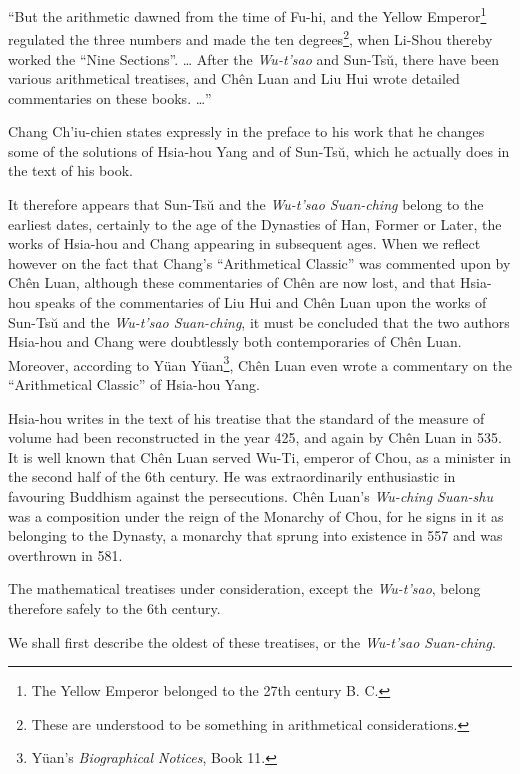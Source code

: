 \documentclass[11pt]{article}
\newcommand{\scanpage}[2]{\clearpage\setcounter{footnote}{0}\noindent{\footnotesize\color{gray}PDF page #1 · #2}\par\medskip}
\newcommand{\scanfooter}{}
\begin{document}
``But the arithmetic dawned from the time of Fu-hi, and the Yellow Emperor\footnote{The Yellow Emperor belonged to the 27th century B. C.} regulated the three numbers and made the ten degrees\footnote{These are understood to be something in arithmetical considerations.}, when Li-Shou thereby worked the ``Nine Sections''. \ldots{} After the \emph{Wu-t'sao} and Sun-Tsŭ, there have been various arithmetical treatises, and Chên Luan and Liu Hui wrote detailed commentaries on these books. \ldots{}''

Chang Ch'iu-chien states expressly in the preface to his work that he changes some of the solutions of Hsia-hou Yang and of Sun-Tsŭ, which he actually does in the text of his book.

It therefore appears that Sun-Tsŭ and the \emph{Wu-t'sao Suan-ching} belong to the earliest dates, certainly to the age of the Dynasties of Han, Former or Later, the works of Hsia-hou and Chang appearing in subsequent ages. When we reflect however on the fact that Chang's ``Arithmetical Classic'' was commented upon by Chên Luan, although these commentaries of Chên are now lost, and that Hsia-hou speaks of the commentaries of Liu Hui and Chên Luan upon the works of Sun-Tsŭ and the \emph{Wu-t'sao Suan-ching}, it must be concluded that the two authors Hsia-hou and Chang were doubtlessly both contemporaries of Chên Luan. Moreover, according to Yüan Yüan\footnote{Yüan's \emph{Biographical Notices}, Book 11.}, Chên Luan even wrote a commentary on the ``Arithmetical Classic'' of Hsia-hou Yang.
\scanfooter

\scanpage{0052}{Part I, printed page 38}

Hsia-hou writes in the text of his treatise that the standard of the measure of volume had been reconstructed in the year 425, and again by Chên Luan in 535. It is well known that Chên Luan served Wu-Ti, emperor of Chou, as a minister in the second half of the 6th century. He was extraordinarily enthusiastic in favouring Buddhism against the persecutions. Chên Luan's \emph{Wu-ching Suan-shu} was a composition under the reign of the Monarchy of Chou, for he signs in it as belonging to the Dynasty, a monarchy that sprung into existence in 557 and was overthrown in 581.

The mathematical treatises under consideration, except the \emph{Wu-t'sao}, belong therefore safely to the 6th century.

We shall first describe the oldest of these treatises, or the \emph{Wu-t'sao Suan-ching}.
\end{document}
